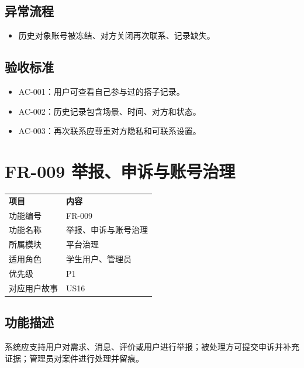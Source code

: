 \subsection{异常流程}\label{ux5f02ux5e38ux6d41ux7a0b-7}

\begin{itemize}
\item
  历史对象账号被冻结、对方关闭再次联系、记录缺失。
\end{itemize}

\subsection{验收标准}\label{ux9a8cux6536ux6807ux51c6-7}

\begin{itemize}
\item
  AC-001：用户可查看自己参与过的搭子记录。
\item
  AC-002：历史记录包含场景、时间、对方和状态。
\item
  AC-003：再次联系应尊重对方隐私和可联系设置。
\end{itemize}

\section{FR-009
举报、申诉与账号治理}\label{fr-009-ux4e3eux62a5ux7533ux8bc9ux4e0eux8d26ux53f7ux6cbbux7406}

{\def\LTcaptype{none} %
\begin{xltabular}{\textwidth}{@{}>{\centering\arraybackslash}X>{\centering\arraybackslash}X@{}}
\toprule\noalign{}
\endhead
\bottomrule\noalign{}
\endlastfoot
\textbf{项目} & \textbf{内容} \\
功能编号 & FR-009 \\
功能名称 & 举报、申诉与账号治理 \\
所属模块 & 平台治理 \\
适用角色 & 学生用户、管理员 \\
优先级 & P1 \\
对应用户故事 & US16 \\
\end{xltabular}
}

\subsection{功能描述}\label{ux529fux80fdux63cfux8ff0-8}

系统应支持用户对需求、消息、评价或用户进行举报；被处理方可提交申诉并补充证据；管理员对案件进行处理并留痕。


